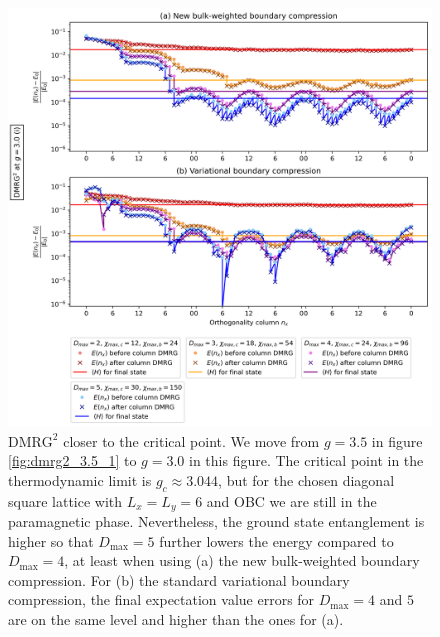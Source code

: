 \newpage
\vspace*{\fill}
\begin{figure}[H]
  \centering
  \includegraphics[width=1.0\linewidth]{dmrg_6_6_3.0_1.png}
  \caption{$\text{DMRG}^2$ closer to the critical point. We move from $g = 3.5$ in figure \ref{fig:dmrg2_3.5_1} to $g = 3.0$ in this figure. The critical point in the thermodynamic limit is $g_c \approx 3.044$, but for the chosen diagonal square lattice with $L_x = L_y = 6$ and OBC we are still in the paramagnetic phase. Nevertheless, the ground state entanglement is higher so that $D_{\text{max}} = 5$ further lowers the energy compared to $D_{\text{max}} = 4$, at least when using (a) the new bulk-weighted boundary compression. For (b) the standard variational boundary compression, the final expectation value errors for $D_{\text{max}} = 4$ and $5$ are on the same level and higher than the ones for (a).}
\label{fig:dmrg2_3.0_1}
\end{figure}
\vspace*{\fill}

